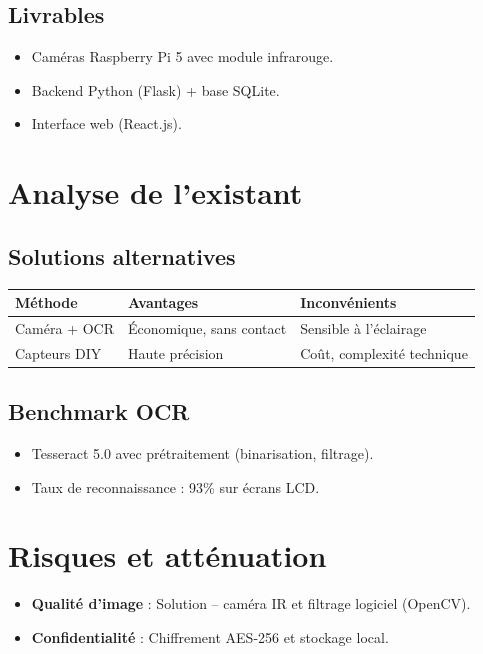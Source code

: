 \subsection{Livrables}
\begin{itemize}
  \item Caméras Raspberry Pi 5 avec module infrarouge.
  \item Backend Python (Flask) + base SQLite.
  \item Interface web (React.js).
\end{itemize}

\section{Analyse de l’existant}
\subsection{Solutions alternatives}
\begin{tabular}{|l|l|l|}
\hline
\textbf{Méthode} & \textbf{Avantages} & \textbf{Inconvénients} \\
\hline
Caméra + OCR & Économique, sans contact & Sensible à l’éclairage \\
\hline
Capteurs DIY & Haute précision & Coût, complexité technique \\
\hline
\end{tabular}

\subsection{Benchmark OCR}
\begin{itemize}
  \item Tesseract 5.0 avec prétraitement (binarisation, filtrage).
  \item Taux de reconnaissance : 93\% sur écrans LCD.
\end{itemize}

\section{Risques et atténuation}
\begin{itemize}
  \item \textbf{Qualité d’image} : Solution -- caméra IR et filtrage logiciel (OpenCV).
  \item \textbf{Confidentialité} : Chiffrement AES-256 et stockage local.
\end{itemize}

